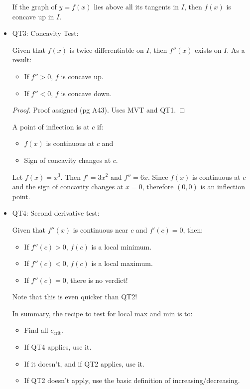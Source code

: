 \begin{itemize}
\begin{definition}
        If the graph of $y=f(x)$ lies above all its tangents in $I$, then $f(x)$ is concave up in $I$.
    \end{definition}
    \item QT3: Concavity Test:
    \begin{idea}
        Given that $f(x)$ is twice differentiable on $I$, then $f''(x)$ exists on $I$. As a result:
        \begin{itemize}
            \item If $f''>0$, $f$ is concave up.
            \item If $f''<0$, $f$ is concave down.
        \end{itemize}
    \end{idea}
    \begin{proof}
        Proof assigned (pg A43). Uses MVT and QT1.
    \end{proof}
    \begin{definition}
        A point of inflection is at $c$ if:
        \begin{itemize}
            \item $f(x)$ is continuous at $c$ and
            \item Sign of concavity changes at $c$.
        \end{itemize} 
    \end{definition}
    \begin{example}
        Let $f(x)=x^3$. Then $f'=3x^2$ and $f''=6x$. Since $f(x)$ is continuous at $c$ and the sign of concavity changes at $x=0$, therefore $(0,0)$ is an inflection point.
    \end{example}
    \item QT4: Second derivative test:
    \begin{idea}
        Given that $f''(x)$ is continuous near $c$ and $f'(c)=0$, then:
        \begin{itemize}
            \item If $f''(c)>0$, $f(c)$ is a local minimum.
            \item If $f''(c)<0$, $f(c)$ is a local maximum.
            \item If $f''(c)=0$, there is no verdict!
        \end{itemize}
    \end{idea}
    Note that this is even quicker than QT2!
    \begin{idea}
        In summary, the recipe to test for local max and min is to:
        \begin{itemize}
            \item Find all $c_\text{crit}$.
            \item If QT4 applies, use it.
            \item If it doesn't, and if QT2 applies, use it.
            \item If QT2 doesn't apply, use the basic definition of increasing/decreasing.
        \end{itemize}
    \end{idea}
\end{itemize}